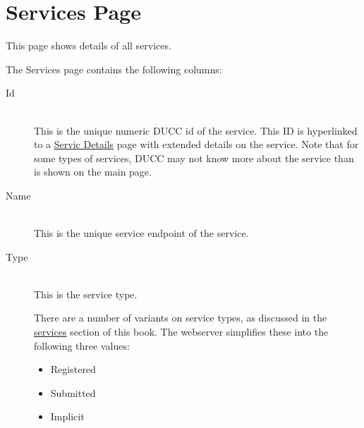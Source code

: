 
    \section{Services Page}
    \label{ws:services-page}
        This page shows details of all services.           

        The Services page contains the following columns: 
        \begin{description}

            \item[Id] \hfill \\
              This is the unique numeric DUCC id of the service.  This ID is hyperlinked to a
              \hyperref[sec:ws-service-details]{Servic Details} page with extended
              details on the service.  Note that for some types of services, DUCC may not
              know more about the service than is shown on the main page.

            \item[Name] \hfill \\
              This is the unique service endpoint of the service.  
              
            \item[Type] \hfill \\
              This is the service type.
              
              There are a number of variants on service types, as discussed in the
              \hyperref[sec:services.types]{services} section of this book.  The webserver
              simplifies these into the following three values:
              \begin{itemize}
                \item Registered
                \item Submitted
                \item Implicit
              \end{itemize}
              

\end{description}
